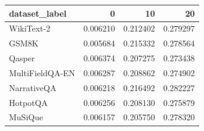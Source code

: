 \begin{tabular}{lrrr}
\toprule
dataset_label & 0 & 10 & 20 \\
\midrule
WikiText-2 & 0.006210 & 0.212402 & 0.279297 \\
GSM8K & 0.005684 & 0.215332 & 0.278564 \\
Qasper & 0.006374 & 0.207275 & 0.273438 \\
MultiFieldQA-EN & 0.006287 & 0.208862 & 0.274902 \\
NarrativeQA & 0.006218 & 0.216492 & 0.282227 \\
HotpotQA & 0.006256 & 0.208130 & 0.275879 \\
MuSiQue & 0.006157 & 0.205750 & 0.278320 \\
\bottomrule
\end{tabular}
